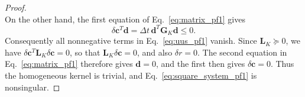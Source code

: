 \documentclass[10pt,a4paper]{amsart}
\begin{document}
\begin{proof}
\begin{equation}
  \end{equation}
  On the other hand, the first equation of Eq.~\eqref{eq:matrix_pf1} gives
  \begin{equation}
    \delta\boldsymbol c^{T}\boldsymbol d =\Delta t\,\boldsymbol d^{T}\boldsymbol{G}_K\boldsymbol d\le0.
  \end{equation}
  Consequently all nonnegative terms in Eq.~\eqref{eq:uus_pf1} vanish. Since $\boldsymbol{L}_K\succeq0$, we have $\delta\boldsymbol c^{T}\boldsymbol{L}_K\delta\boldsymbol c=0$, so that $\boldsymbol{L}_K\delta\boldsymbol c=0$, and also $\delta r=0$. The second equation in Eq.~\eqref{eq:matrix_pf1} therefore gives $\boldsymbol d=0$, and the first then gives $\delta\boldsymbol c=0$. Thus the homogeneous kernel is trivial, and Eq.~\eqref{eq:square_system_pf1} is nonsingular.
\end{proof}
\end{document}
